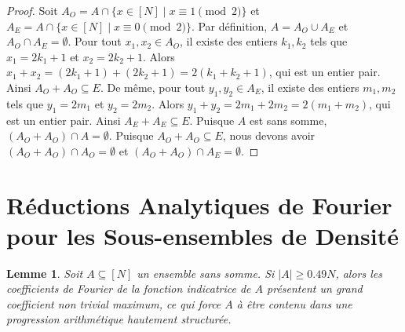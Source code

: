 \documentclass[12pt, a4paper]{article}
\newtheorem{lemma}[theorem]{Lemme}
\begin{document}
\begin{proof}
Soit $A_O = A \cap \{x \in [N] \mid x \equiv 1 \pmod 2\}$ et $A_E = A \cap \{x \in [N] \mid x \equiv 0 \pmod 2\}$.
Par d\'efinition, $A = A_O \cup A_E$ et $A_O \cap A_E = \emptyset$.
Pour tout $x_1, x_2 \in A_O$, il existe des entiers $k_1, k_2$ tels que $x_1 = 2k_1 + 1$ et $x_2 = 2k_2 + 1$.
Alors $x_1 + x_2 = (2k_1 + 1) + (2k_2 + 1) = 2(k_1 + k_2 + 1)$, qui est un entier pair. Ainsi $A_O + A_O \subseteq E$.
De m\^eme, pour tout $y_1, y_2 \in A_E$, il existe des entiers $m_1, m_2$ tels que $y_1 = 2m_1$ et $y_2 = 2m_2$.
Alors $y_1 + y_2 = 2m_1 + 2m_2 = 2(m_1 + m_2)$, qui est un entier pair. Ainsi $A_E + A_E \subseteq E$.
Puisque $A$ est sans somme, $(A_O + A_O) \cap A = \emptyset$. Puisque $A_O + A_O \subseteq E$, nous devons avoir $(A_O + A_O) \cap A_O = \emptyset$ et $(A_O + A_O) \cap A_E = \emptyset$.
\end{proof}

\section{R\'eductions Analytiques de Fourier pour les Sous-ensembles de Densit\'e}

\begin{lemma}
Soit $A \subseteq [N]$ un ensemble sans somme. Si $|A| \ge 0.49N$, alors les coefficients de Fourier de la fonction indicatrice de $A$ pr\'esentent un grand coefficient non trivial maximum, ce qui force $A$ \`a \^etre contenu dans une progression arithm\'etique hautement structur\'ee.
\end{lemma}
\end{document}
